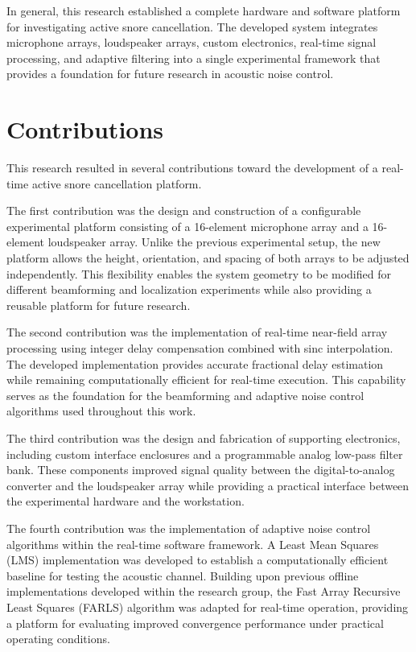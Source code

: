 In general, this research established a complete hardware and software platform for investigating active snore cancellation. The developed system integrates microphone arrays, loudspeaker arrays, custom electronics, real-time signal processing, and adaptive filtering into a single experimental framework that provides a foundation for future research in acoustic noise control.

\section{Contributions}

This research resulted in several contributions toward the development of a real-time active snore cancellation platform.

The first contribution was the design and construction of a configurable experimental platform consisting of a 16-element microphone array and a 16-element loudspeaker array. Unlike the previous experimental setup, the new platform allows the height, orientation, and spacing of both arrays to be adjusted independently. This flexibility enables the system geometry to be modified for different beamforming and localization experiments while also providing a reusable platform for future research.

The second contribution was the implementation of real-time near-field array processing using integer delay compensation combined with sinc interpolation. The developed implementation provides accurate fractional delay estimation while remaining computationally efficient for real-time execution. This capability serves as the foundation for the beamforming and adaptive noise control algorithms used throughout this work.

The third contribution was the design and fabrication of supporting electronics, including custom interface enclosures and a programmable analog low-pass filter bank. These components improved signal quality between the digital-to-analog converter and the loudspeaker array while providing a practical interface between the experimental hardware and the workstation.

The fourth contribution was the implementation of adaptive noise control algorithms within the real-time software framework. A Least Mean Squares (LMS) implementation was developed to establish a computationally efficient baseline for testing the acoustic channel. Building upon previous offline implementations developed within the research group, the Fast Array Recursive Least Squares (FARLS) algorithm was adapted for real-time operation, providing a platform for evaluating improved convergence performance under practical operating conditions.

